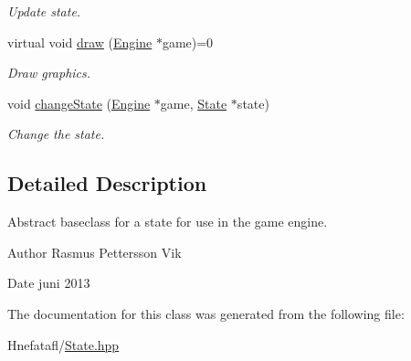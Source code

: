 \begin{DoxyCompactItemize}
\begin{DoxyCompactList}\small\item\em Update state. \end{DoxyCompactList}\item 
\hypertarget{class_state_a9805910fcf77a70b00c0c26ef37898f6}{virtual void \hyperlink{class_state_a9805910fcf77a70b00c0c26ef37898f6}{draw} (\hyperlink{class_engine}{Engine} $\ast$game)=0}\label{class_state_a9805910fcf77a70b00c0c26ef37898f6}

\begin{DoxyCompactList}\small\item\em Draw graphics. \end{DoxyCompactList}\item 
\hypertarget{class_state_a2244bb66f8aafc2e9d2fd3366ed1e575}{void \hyperlink{class_state_a2244bb66f8aafc2e9d2fd3366ed1e575}{change\-State} (\hyperlink{class_engine}{Engine} $\ast$game, \hyperlink{class_state}{State} $\ast$state)}\label{class_state_a2244bb66f8aafc2e9d2fd3366ed1e575}

\begin{DoxyCompactList}\small\item\em Change the state. \end{DoxyCompactList}\end{DoxyCompactItemize}


\subsection{Detailed Description}
Abstract baseclass for a state for use in the game engine. 

\begin{DoxyAuthor}{Author}
Rasmus Pettersson Vik 
\end{DoxyAuthor}
\begin{DoxyDate}{Date}
juni 2013 
\end{DoxyDate}


The documentation for this class was generated from the following file\-:\begin{DoxyCompactItemize}
\item 
Hnefatafl/\hyperlink{_state_8hpp}{State.\-hpp}\end{DoxyCompactItemize}
